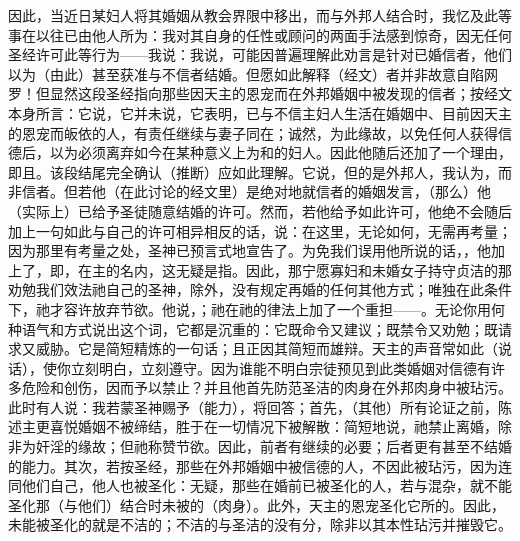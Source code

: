 因此，当近日某妇人将其婚姻从教会界限中移出，而与外邦人结合时，我忆及此等事在以往已由他人所为：我对其自身的任性或顾问的两面手法感到惊奇，因无任何圣经许可此等行为——我说：我说，可能因普遍理解此劝言是针对已婚信者，他们以为（由此）甚至获准与不信者结婚。但愿如此解释（经文）者并非故意自陷网罗！但显然这段圣经指向那些因天主的恩宠而在外邦婚姻中被发现的信者；按经文本身所言：它说，它并未说，它表明，已与不信主妇人生活在婚姻中、目前因天主的恩宠而皈依的人，有责任继续与妻子同在；诚然，为此缘故，以免任何人获得信德后，以为必须离弃如今在某种意义上为和的妇人。因此他随后还加了一个理由，即且。该段结尾完全确认（推断）应如此理解。它说，但的是外邦人，我认为，而非信者。但若他（在此讨论的经文里）是绝对地就信者的婚姻发言，（那么）他（实际上）已给予圣徒随意结婚的许可。然而，若他给予如此许可，他绝不会随后加上一句如此与自己的许可相异相反的话，说：在这里，无论如何，无需再考量；因为那里有考量之处，圣神已预言式地宣告了。为免我们误用他所说的话，，他加上了，即，在主的名内，这无疑是指。因此，那宁愿寡妇和未婚女子持守贞洁的那劝勉我们效法祂自己的圣神，除外，没有规定再婚的任何其他方式；唯独在此条件下，祂才容许放弃节欲。他说，；祂在祂的律法上加了一个重担——。无论你用何种语气和方式说出这个词，它都是沉重的：它既命令又建议；既禁令又劝勉；既请求又威胁。它是简短精炼的一句话；且正因其简短而雄辩。天主的声音常如此（说话），使你立刻明白，立刻遵守。因为谁能不明白宗徒预见到此类婚姻对信德有许多危险和创伤，因而予以禁止？并且他首先防范圣洁的肉身在外邦肉身中被玷污。此时有人说：我若蒙圣神赐予（能力），将回答；首先，（其他）所有论证之前，陈述主更喜悦婚姻不被缔结，胜于在一切情况下被解散：简短地说，祂禁止离婚，除非为奸淫的缘故；但祂称赞节欲。因此，前者有继续的必要；后者更有甚至不结婚的能力。其次，若按圣经，那些在外邦婚姻中被信德的人，不因此被玷污，因为连同他们自己，他人也被圣化：无疑，那些在婚前已被圣化的人，若与混杂，就不能圣化那（与他们）结合时未被的（肉身）。此外，天主的恩宠圣化它所的。因此，未能被圣化的就是不洁的；不洁的与圣洁的没有分，除非以其本性玷污并摧毁它。\par

